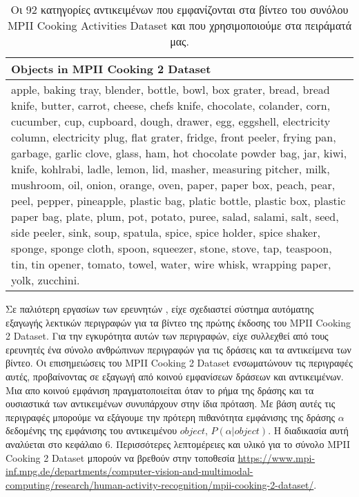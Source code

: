 \begin{table}
    \begin{tabular}{|p{13.55cm}|}
    \hline
    Objects in MPII Cooking 2 Dataset \\ \hline
    apple, baking tray, blender, bottle, bowl, box grater, bread, bread knife, butter, carrot, cheese, chefs knife, chocolate, colander, corn, cucumber, cup, cupboard, dough, drawer, egg, eggshell, electricity column, electricity plug, flat grater, fridge, front peeler, frying pan, garbage, garlic clove, glass, ham, hot chocolate powder bag, jar, kiwi, knife, kohlrabi, ladle, lemon, lid, masher, measuring pitcher, milk, mushroom, oil, onion, orange, oven, paper, paper box, peach, pear, peel, pepper, pineapple, plastic bag, platic bottle, plastic box, plastic paper bag, plate, plum, pot, potato, puree, salad, salami, salt, seed, side peeler, sink, soup, spatula, spice, spice holder, spice shaker, sponge, sponge cloth, spoon, squeezer, stone, stove, tap, teaspoon, tin, tin opener, tomato, towel, water, wire whisk, wrapping paper, yolk, zucchini. \\
    \hline
    \end{tabular}
	\caption{Οι 92 κατηγορίες αντικειμένων που εμφανίζονται στα βίντεο του συνόλου MPII Cooking Activities Dataset και που χρησιμοποιούμε στα πειράματά μας.}
	\label{tab:DataNouns}
\end{table}

\par Σε παλιότερη εργασίων των ερευνητών \cite{regneri_2013}, είχε σχεδιαστεί σύστημα αυτόματης εξαγωγής λεκτικών περιγραφών για τα βίντεο της πρώτης έκδοσης του MPII Cooking 2 Dataset. Για την εγκυρότητα αυτών των περιγραφών, είχε συλλεχθεί από τους ερευνητές ένα σύνολο ανθρώπινων περιγραφών για τις δράσεις και τα αντικείμενα των βίντεο. Οι επισημειώσεις του MPII Cooking 2 Dataset ενσωματώνουν τις περιγραφές αυτές, προβαίνοντας σε εξαγωγή από κοινού εμφανίσεων δράσεων και αντικειμένων. Μια απο κοινού εμφάνιση πραγματοποιείται όταν το ρήμα της δράσης και τα ουσιαστικά των αντικειμένων συνυπάρχουν στην ίδια πρόταση. Με βάση αυτές τις περιγραφές μπορούμε να εξάγουμε την πρότερη πιθανότητα εμφάνισης της δράσης $\alpha$ δεδομένης της εμφάνισης του αντικειμένου $object$, $P(\alpha|object)$. Η διαδικασία αυτή αναλύεται στο κεφάλαιο 6. Περισσότερες λεπτομέρειες και υλικό για το σύνολο MPII Cooking 2 Dataset μπορούν να βρεθούν στην τοποθεσία \url{https://www.mpi-inf.mpg.de/departments/computer-vision-and-multimodal-computing/research/human-activity-recognition/mpii-cooking-2-dataset/}.


